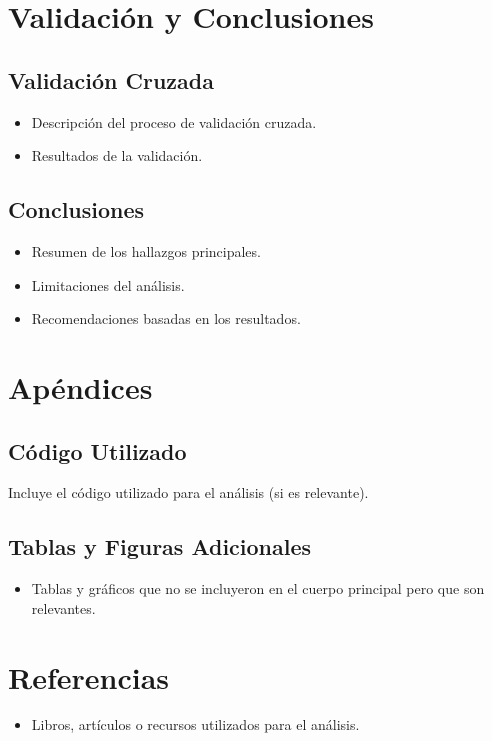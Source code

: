 \documentclass{article}
\begin{document}
\section{Validación y Conclusiones}
\subsection{Validación Cruzada}
\begin{itemize}
    \item Descripción del proceso de validación cruzada.
    \item Resultados de la validación.
\end{itemize}

\subsection{Conclusiones}
\begin{itemize}
    \item Resumen de los hallazgos principales.
    \item Limitaciones del análisis.
    \item Recomendaciones basadas en los resultados.
\end{itemize}

\section{Apéndices}
\subsection{Código Utilizado}
Incluye el código utilizado para el análisis (si es relevante).

\subsection{Tablas y Figuras Adicionales}
\begin{itemize}
    \item Tablas y gráficos que no se incluyeron en el cuerpo principal pero que son relevantes.
\end{itemize}

\section*{Referencias}
\begin{itemize}
    \item Libros, artículos o recursos utilizados para el análisis.
\end{itemize}
\end{document}
